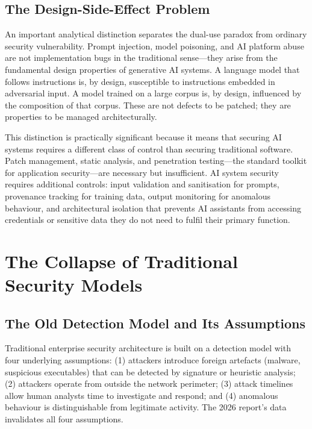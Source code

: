 \documentclass[journal]{IEEEtran}
\begin{document}
\subsection{The Design-Side-Effect Problem}

An important analytical distinction separates the dual-use paradox from ordinary
security vulnerability. Prompt injection, model poisoning, and AI platform abuse
are not implementation bugs in the traditional sense---they arise from the
fundamental design properties of generative AI systems. A language model that
follows instructions is, by design, susceptible to instructions embedded in
adversarial input. A model trained on a large corpus is, by design, influenced by
the composition of that corpus. These are not defects to be patched; they are
properties to be managed architecturally.

This distinction is practically significant because it means that securing AI
systems requires a different class of control than securing traditional software.
Patch management, static analysis, and penetration testing---the standard toolkit
for application security---are necessary but insufficient. AI system security
requires additional controls: input validation and sanitisation for prompts,
provenance tracking for training data, output monitoring for anomalous behaviour,
and architectural isolation that prevents AI assistants from accessing credentials
or sensitive data they do not need to fulfil their primary function.

\section{The Collapse of Traditional Security Models}
\label{sec:collapse}

\subsection{The Old Detection Model and Its Assumptions}

Traditional enterprise security architecture is built on a detection model with four
underlying assumptions: (1) attackers introduce foreign artefacts (malware,
suspicious executables) that can be detected by signature or heuristic analysis;
(2) attackers operate from outside the network perimeter; (3) attack timelines
allow human analysts time to investigate and respond; and (4) anomalous behaviour
is distinguishable from legitimate activity. The 2026 report's data invalidates
all four assumptions.
\end{document}
